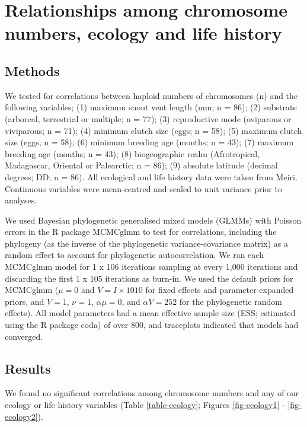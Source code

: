 \documentclass[a4paper, 12pt]{article}
\begin{document}
\newpage
\section{Relationships among chromosome numbers, ecology and life history}

\subsection{Methods}

We tested for correlations between haploid numbers of chromosomes (n) and the following variables; (1) maximum snout vent length (mm; n = 86); (2) substrate (arboreal, terrestrial or multiple; n = 77); (3) reproductive mode (oviparous or viviparous; n = 71); (4) minimum clutch size (eggs; n = 58); (5) maximum clutch size (eggs; n = 58); (6) minimum breeding age (months; n = 43); (7) maximum breeding age (months; n = 43); (8) biogeographic realm (Afrotropical, Madagascar, Oriental or Palearctic; n = 86); (9) absolute latitude (decimal degrees; DD; n = 86). All ecological and life history data were taken from Meiri\cite{meiri2018traits}. Continuous variables were mean-centred and scaled to unit variance prior to analyses.

We used Bayesian phylogenetic generalised mixed models (GLMMs) with Poisson errors in the R package MCMCglmm\cite{hadfield2010mcmc} to test for correlations, including the phylogeny (as the inverse of the phylogenetic variance-covariance matrix) as a random effect to account for phylogenetic autocorrelation. We ran each MCMCglmm model for 1 x 106 iterations sampling at every 1,000 iterations and discarding the first 1 x 105 iterations as burn-in. We used the default priors for MCMCglmm ($μ = 0$ and $V = I × 1010$ for fixed effects and parameter expanded priors, and $V = 1$, $\nu = 1$, $\alpha \mu = 0$, and $\alpha V = 252$ for the phylogenetic random effects). All model parameters had a mean effective sample size (ESS; estimated using the R package coda\cite{plummer2006coda}) of over 800, and traceplots indicated that models had converged.

\subsection{Results}

We found no significant correlations among chromosome numbers and any of our ecology or life history variables (Table \ref{table-ecology}; Figures \ref{fig-ecology1} - \ref{fig-ecology2}). 
\end{document}
